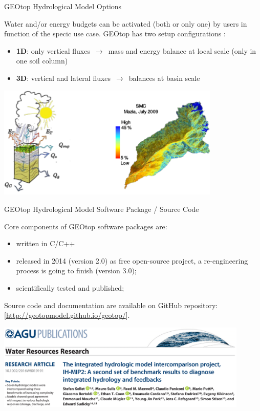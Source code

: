 \documentclass[ignorenonframetext,]{beamer}
\providecommand{\tightlist}{%
  \setlength{\itemsep}{0pt}\setlength{\parskip}{0pt}}
\begin{document}
\begin{frame}{GEOtop Hydrological Model Options}

Water and/or energy budgets can be activated (both or only one) by users
in function of the specic use case. GEOtop has two setup configurations
:

\begin{itemize}
\item
  \textbf{1D}: only vertical fluxes \(\,\to\,\) mass and energy balance
  at local scale (only in one soil column)
\item
  \textbf{3D}: vertical and lateral fluxes \(\,\to\,\) balances at basin
  scale
\end{itemize}

\includegraphics[width=0.80000\textwidth]{resources/images/geotop_ET_SWC.png}\\

\end{frame}

\begin{frame}{GEOtop Hydrological Model Software Package / Source Code}

Core components of GEOtop software packages are:

\begin{itemize}
\tightlist
\item
  written in C/C++
\item
  released in 2014 (version 2.0) as free open-source project, a
  re-engineering process is going to finish (version 3.0);
\item
  scientifically tested and published;
\end{itemize}

Source code and documentation are available on GitHub repository:
{[}\url{http://geotopmodel.github.io/geotop/}{]}.

\includegraphics[width=0.90000\textwidth]{resources/images/geotop_paper_2017.png}\\

\end{frame}
\end{document}
